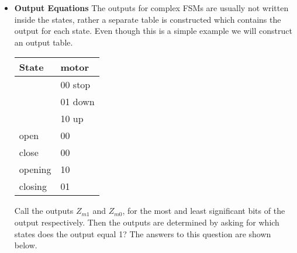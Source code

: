 \begin{enumerate}
\begin{onlysolution}
{\begin{itemize}
                        {\addtolength{\tabcolsep}{-0.4em}
                            \begin{tabular}{lll}
                                $D_{open}     $&$=\, Q_{open}button'  $&$+\, Q_{opening}up$ \\
                                $D_{close}    $&$=\, Q_{close}button' $&$+\, Q_{closing}down$ \\
                                $D_{opening}  $&$=\, Q_{close}button  $&$+\, Q_{opening}up'$ \\
                                $D_{closing}  $&$=\, Q_{open}button   $&$+\, Q_{closing}down'$ \\
                        \end{tabular}}

                    \item\textbf{Output Equations}
                        The outputs for complex FSMs are usually not written inside the
                        states, rather a separate table is constructed which contains the
                        output for each state.   Even though this is a simple example
                        we will construct an output table.

                        \begin{tabular}{l|l}
                            State    & motor        \\ \hline
                            & 00 stop    \\ \hline
                            & 01 down    \\ \hline
                            & 10 up        \\ \hline
                            open    & 00         \\ \hline
                            close   & 00        \\ \hline
                            opening & 10         \\ \hline
                            closing & 01         \\
                        \end{tabular}

                        Call the outputs $Z_{m1}$ and $Z_{m0}$, for the most and least
                        significant bits of the output respectively.  Then the outputs
                        are determined by asking for which states does the output
                        equal 1?  The answers to this question are shown below.


\end{itemize}}
\end{onlysolution}
\end{enumerate}

